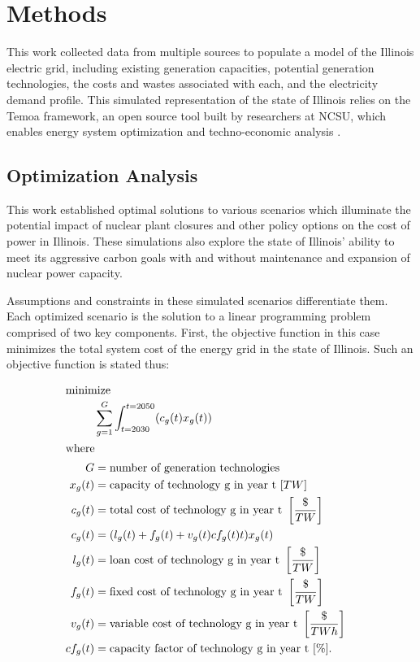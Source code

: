 \section{Methods}\label{sec:methods}
This work collected data from multiple sources to populate a model of the 
Illinois electric grid, including existing generation capacities, potential 
generation technologies, the costs and wastes associated with each, and the 
electricity demand profile. This simulated representation of the state of 
Illinois relies on the Temoa framework, an open source tool built by 
researchers at \gls{NCSU}, which enables energy system optimization and 
techno-economic analysis 
\cite{decarolis_temoa_2010,decarolis_modelling_2016,decarolis_formalizing_2017}.

\subsection{Optimization Analysis}
This work established optimal solutions to 
various scenarios which illuminate the potential impact of nuclear plant 
closures and other policy options on the cost of power in Illinois. These 
simulations  also explore the state of Illinois' ability to meet its aggressive 
carbon goals with and without maintenance and expansion of nuclear power 
capacity. 

Assumptions and constraints in these simulated scenarios differentiate them. 
Each optimized scenario is the solution to a linear programming 
problem  comprised of two key components. First, the objective function in this 
case minimizes the total system cost of the energy grid in the state of 
Illinois. 
Such an objective function is stated thus:

\begin{align}
\intertext{minimize} 
        &\sum_{g=1}^G\int_{t=2030}^{t=2050} (c_g(t)x_g(t))\\
\intertext{where}
        G&=\text{number of generation technologies}&\nonumber\\
        x_g(t)&=\text{capacity of technology g in year t }[TW] &\nonumber\\
        c_g(t)&=\text{total cost of technology g in year t }\left[\frac{\$}{TW}\right]&\nonumber\\
        c_g(t)&= (l_g(t) + f_g(t) + v_g(t)cf_g(t)t)x_g(t)\nonumber\\
        l_g(t)&=\text{loan cost of technology g in year t }\left[\frac{\$}{TW}\right]&\nonumber\\
        f_g(t)&=\text{fixed cost of technology g in year t }\left[\frac{\$}{TW}\right]&\nonumber\\
        v_g(t)&=\text{variable cost of technology g in year t }\left[\frac{\$}{TWh}\right]&\nonumber\\
        cf_g(t)&=\text{capacity factor of technology g in year t }[\%] .&\nonumber
\end{align}

